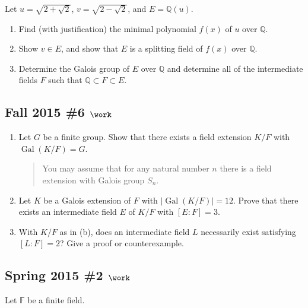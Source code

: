 Let \(u = \sqrt{2 + \sqrt{2}}\), \(v = \sqrt{2 - \sqrt{2}}\), and
\(E = {\mathbb{Q}}(u)\).

\begin{enumerate}
\def\labelenumi{\alph{enumi}.}
\item
  Find (with justification) the minimal polynomial \(f(x)\) of \(u\)
  over \({\mathbb{Q}}\).
\item
  Show \(v\in E\), and show that \(E\) is a splitting field of \(f(x)\)
  over \({\mathbb{Q}}\).
\item
  Determine the Galois group of \(E\) over \({\mathbb{Q}}\) and
  determine all of the intermediate fields \(F\) such that
  \({\mathbb{Q}}\subset F \subset E\).
\end{enumerate}

\hypertarget{fall-2015-6-work}{%
\subsection{\texorpdfstring{Fall 2015 \#6
\(\work\)}{Fall 2015 \#6 \textbackslash work}}\label{fall-2015-6-work}}

\begin{enumerate}
\def\labelenumi{\alph{enumi}.}
\item
  Let \(G\) be a finite group. Show that there exists a field extension
  \(K/F\) with \({ \operatorname{Gal}} (K/F) = G\).

  \begin{quote}
  You may assume that for any natural number \(n\) there is a field
  extension with Galois group \(S_n\).
  \end{quote}
\item
  Let \(K\) be a Galois extension of \(F\) with
  \({\left\lvert {{ \operatorname{Gal}} (K/F)} \right\rvert} = 12\).
  Prove that there exists an intermediate field \(E\) of \(K/F\) with
  \([E: F] = 3\).
\item
  With \(K/F\) as in (b), does an intermediate field \(L\) necessarily
  exist satisfying \([L: F] = 2\)? Give a proof or counterexample.
\end{enumerate}

\hypertarget{spring-2015-2-work}{%
\subsection{\texorpdfstring{Spring 2015 \#2
\(\work\)}{Spring 2015 \#2 \textbackslash work}}\label{spring-2015-2-work}}

Let \({\mathbb{F}}\) be a finite field.

